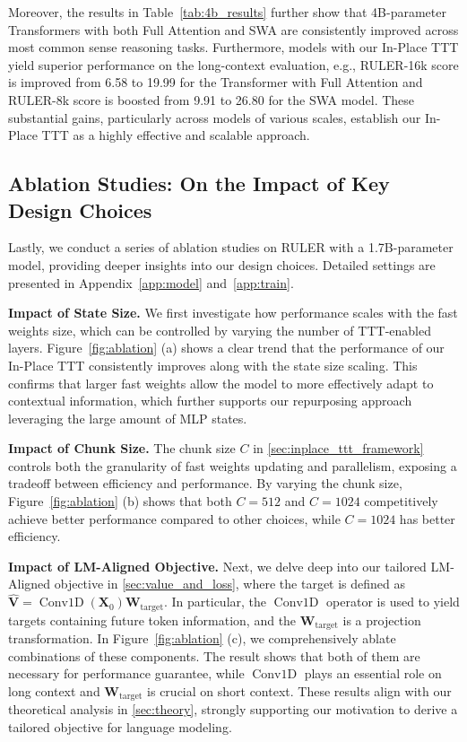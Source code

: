 Moreover, the results in Table~\ref{tab:4b_results} further show that 4B-parameter Transformers with both Full Attention and SWA are consistently improved across most common sense reasoning tasks. Furthermore, models with our In-Place TTT yield superior performance on the long-context evaluation, e.g., RULER-16k score is improved from 6.58 to 19.99 for the Transformer with Full Attention and RULER-8k score is boosted from 9.91 to 26.80 for the SWA model. These substantial gains, particularly across models of various scales, establish our In-Place TTT as a highly effective and scalable approach.


\subsection{Ablation Studies: On the Impact of Key Design Choices}
\label{sec:exp_ablation}


Lastly, we conduct a series of ablation studies on RULER with a 1.7B-parameter model, providing deeper insights into our design choices. Detailed settings are presented in Appendix~\ref{app:model} and~\ref{app:train}.

\textbf{Impact of State Size.}
We first investigate how performance scales with the fast weights size, which can be controlled by varying the number of TTT-enabled layers. Figure~\ref{fig:ablation} (a) shows a clear trend that the performance of our In-Place TTT consistently improves along with the state size scaling. This confirms that larger fast weights allow the model to more effectively adapt to contextual information, which further supports our repurposing approach leveraging the large amount of MLP states.

\textbf{Impact of Chunk Size.} The chunk size $C$ in \cref{sec:inplace_ttt_framework} controls both the granularity of fast weights updating and parallelism, exposing a tradeoff between efficiency and performance. By varying the chunk size, Figure~\ref{fig:ablation} (b) shows that both $C=512$ and $C=1024$ competitively achieve better performance compared to other choices, while $C=1024$ has better efficiency.

\textbf{Impact of LM-Aligned Objective.}
Next, we delve deep into our tailored LM-Aligned objective in \cref{sec:value_and_loss}, where the target is defined as
$\hat{\mathbf{V}} = \operatorname{Conv1D}(\mathbf{X}_0) \mathbf{W}_{\mathrm{target}}$.
In particular, the $\operatorname{Conv1D}$ operator is used to yield targets containing future token information, and the $\mathbf{W}_{\mathrm{target}}$ is a projection transformation. In Figure~\ref{fig:ablation} (c), we comprehensively ablate combinations of these components. The result shows that both of them are necessary for performance guarantee, while $\operatorname{Conv1D}$ plays an essential role on long context and $\mathbf{W}_{\mathrm{target}}$ is crucial on short context. These results align with our theoretical analysis in \cref{sec:theory}, strongly supporting our motivation to derive a tailored objective for language modeling.

